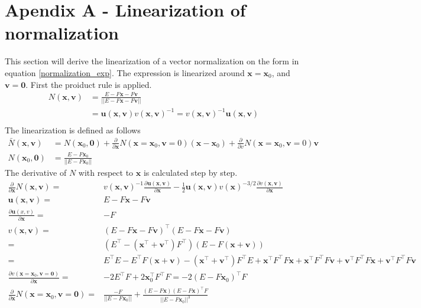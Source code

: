 \section{Apendix A - Linearization of normalization} 
\label{Appendix_linearization}

This section will derive the linearization of a vector normalization on the form in equation \ref{normalization_exp}. The expression is linearized around $\bm{x}=\bm{x}_0$, and $\bm{v}=\bm{0}$. 
First the proiduct rule is applied.
\begin{align}
        N(\bm{x},\bm{v}) & = \frac{E - F \bm{x} - F \bm{v} }{|| E - F \bm{x} - F \bm{v} ||} \label{normalization_exp}\\
        & = \bm{u}(\bm{x},\bm{v}) v(\bm{x},\bm{v})^{-1} = v(\bm{x},\bm{v})^{-1} \bm{u}(\bm{x},\bm{v}) \\
\end{align}
The linearization is defined as follows
\begin{align}
    \bar{N}(\bm{x},\bm{v}) & = N(\bm{x}_0,\bm{0}) + \frac{\partial}{\partial \bm{x}} N(\bm{x}=\bm{x}_0,\bm{v}=0) (\bm{x}-\bm{x}_0) +\frac{\partial}{\partial v} N(\bm{x}=\bm{x}_0,\bm{v}=0) \bm{v} \\
    N(\bm{x}_0,\bm{0}) & = \frac{E - F \bm{x}_0}{|| E - F \bm{x}_0||}
\end{align}
The derivative of $N$ with respect to $\bm{x}$ is calculated step by step.
\begin{align}
    \frac{\partial}{\partial \bm{x}} N(\bm{x},\bm{v}) ={} & v(\bm{x},\bm{v})^{-1} \frac{\partial \bm{u}(\bm{x},\bm{v})}{\partial \bm{x}}  - \frac{1}{2} \bm{u}(\bm{x},\bm{v}) v(\bm{x})^{-3/2} \frac{\partial v(\bm{x},\bm{v})}{\partial \bm{x}}\\
    \bm{u}(\bm{x},\bm{v}) ={} &  E - F \bm{x} - F \bm{v} \\
    \frac{\partial \bm{u}(x,v)}{\partial \bm{x}} ={} & -F \\
    v(\bm{x},\bm{v}) ={} & (E-F\bm{x} - F \bm{v})^\top (E-F\bm{x} - F \bm{v})\\
    ={} & (E^\top-(\bm{x}^\top +\bm{v}^\top)  F^\top )(E-F(\bm{x} +\bm{v}))\\
    ={} & E^\top E - E^\top F (\bm{x} +\bm{v}) - (\bm{x}^\top +\bm{v}^\top) F^\top E + \bm{x}^\top F^\top F \bm{x} 
    +\bm{x}^\top F^\top F \bm{v}
    +\bm{v}^\top F^\top F \bm{x}
    +\bm{v}^\top F^\top F \bm{v} \\
    \frac{\partial v(\bm{x}=\bm{x}_0,\bm{v}=\bm{0})}{\partial \bm{x}} = {}&  - 2 E^\top F + 2 \bm{x}_0^\top F^\top F = -2(E-F \bm{x}_0)^\top F\\
    \frac{\partial}{\partial \bm{x}} N(\bm{x} = \bm{x}_0, \bm{v} = \bm{0}) ={} & \frac{-F}{||E - F \bm{x}_0||} + \frac{(E - F \bm{x})(E - F \bm{x})^\top F}{||E - F \bm{x}_0||^3}\\
\end{align}
